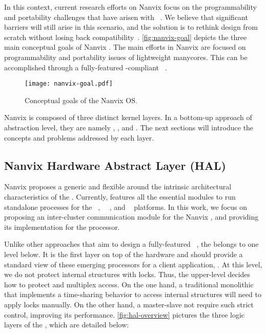 	In this context, current research efforts on Nanvix \os focus on the
	programmability and portability	challenges that have arisen with
	\lightweight \manycores~\cite{christgau2017, gamell2012, serres2011}.
	We believe that significant barriers will still arise in this scenario, and
	the solution is to rethink \os design from scratch without losing back
	compatibility~\cite{penna:compas19, penna2019}.
	\autoref{fig:nanvix-goal} depicts the three main conceptual goals of Nanvix \os.
	The main efforts in Nanvix \os are focused on programmability and portability
	issues of lightweight manycores. This can be accomplished through a fully-featured
	\posix-compliant \os~\cite{penna:compas19}.

	\begin{figure}[!tb]
		\centering%
		\caption{Conceptual goals of the Nanvix OS.}%
		\label{fig:nanvix-goal}%
		\texttt{[image: nanvix-goal.pdf]}%
	\end{figure}

	Nanvix \os is composed of three distinct kernel layers.
	In a bottom-up approach of abstraction level, they are namely \textit{\nanvix \hal},
	\textit{\nanvix \microkernel}, and \textit{\nanvix \multikernel}.
	The next sections will introduce the concepts and problems addressed by
	each layer.

	\subsection{Nanvix Hardware Abstract Layer (HAL)}
	\label{sec.hal}

		Nanvix \os proposes a generic and flexible \hal around the
		intrinsic architectural characteristics of the \lightweight \manycores.
		Currently, \hal features all the essential modules to run standalone
		processes for the \mppa~\cite{DeDinechin2013-1}, \optimsoc~~\cite{Wallentowitz2013},
		and \hero~\cite{Kurth2017} platforms.
		In this work, we focus on proposing an inter-cluster communication module
		for the Nanvix \hal, and providing its implementation for the \mppa processor.

		Unlike other approaches that aim to design a fully-featured \os~\cite{Baumann2009,kluge2014,nightingale2009,rhoden2011},
		the \hal belongs to one level below.
		It is the first layer on top of the hardware and should provide a standard
		view of these emerging processors for a client application, \eg \os.
		At this level, we do not protect internal structures with locks.
		Thus, the upper-level decides how to protect and multiplex \hal access.
		On the one hand, a traditional monolithic \os that implements a time-sharing
		behavior to access internal structures will need to apply locks manually.
		On the other hand, a master-slave \os not require such strict control,
		improving its performance.
		\autoref{fig:hal-overview} pictures the three logic layers of the \hal, which are
		detailed below:

